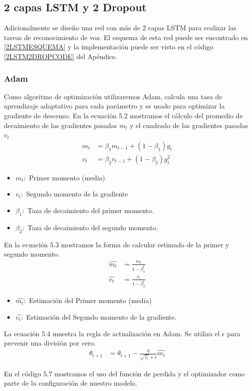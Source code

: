 \subsection{2 capas LSTM y 2 Dropout}
Adicionalmente se diseño una red con más de 2 capas LSTM para realizar las tareas de reconocimiento de voz. El esquema de esta red puede ser encontrado en \ref{2LSTMESQUEMA} y la implementación puede ser visto en el código \ref{2LSTM2DROPCODE} del Apéndice.



\subsubsection{Adam}
Como algoritmo de optimización utilizaremos Adam, calcula una tasa de aprendizaje adaptativo para cada parámetro y es usado para optimizar la gradiente de descenso.
En la ecuación 5.2 mostramos el cálculo del promedio de decaimiento de las gradientes pasadas $m_{t}$ y el cuadrado de las gradientes pasadas $v_{t}$
\begin{equation}
\label{adam1}
\begin{aligned}
m_{t} &= \beta_{1} m_{t-1} +(1-\beta_{1})g_{t} \\
v_{t} &= \beta_{2} v_{t-1} +(1-\beta_{2})g_{t}^2
\end{aligned}
\end{equation}

\begin{itemize}
	\item $m_{t}:$ Primer momento (media)
	\item $v_{t}:$ Segundo momento de la gradiente
	\item $\beta_{1}:$ Taza de decaimiento del primer momento.
	\item $\beta_{2}:$ Taza de decaimiento del segundo momento.
\end{itemize}
En la ecuación 5.3 mostramos la forma de calcular estimado de la primer y segundo momento.
\begin{equation}
\label{adam2}
\begin{aligned}
\hat{m_{t}}&= \frac{m_{t}}{1-\beta_{1}^{t}} \\
\hat{v_{t}} &= \frac{v_{t}}{1-\beta_{2}^{t}}
\end{aligned}
\end{equation}

\begin{itemize}
	\item $\hat{m_{t}}:$ Estimación del Primer momento (media)
	\item $\hat{v_{t}}:$ Estimación del Segundo momento de la gradiente.
\end{itemize}

La ecuación 5.4 muestra la regla de actualización en Adam. Se utiliza el $\epsilon$ para prevenir una división por cero.
\begin{equation}
\label{adam3}
\begin{aligned}
\theta_{t+1}&= \theta_{t+1} - \frac{\eta}{\sqrt{\hat{v_{t}}}+\epsilon} \hat{m_{t}}	
\end{aligned}
\end{equation}

En el código 5.7 mostramos el uso del función de perdida y el optimizador como parte de la configuración de nuestro modelo.
